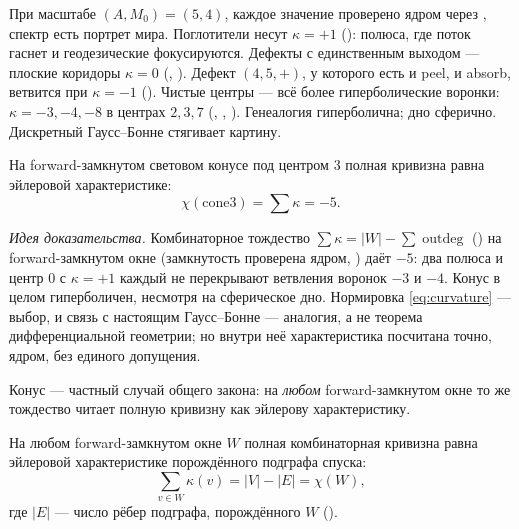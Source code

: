 При масштабе $(A, M_0) = (5, 4)$, каждое значение проверено ядром через , спектр есть
портрет мира. Поглотители несут $\kappa = +1$ (): полюса, где поток гаснет и
геодезические фокусируются. Дефекты с единственным выходом --- плоские коридоры $\kappa = 0$
(, ). Дефект $(4,5,+)$, у которого есть и
peel, и absorb, ветвится при $\kappa = -1$ (). Чистые центры --- всё
более гиперболические воронки: $\kappa = -3, -4, -8$ в центрах $2, 3, 7$ (,
, ). Генеалогия гиперболична; дно сферично.
Дискретный Гаусс--Бонне стягивает картину.

\begin{theorem}\label{thm:gaussBonnet_cone3}
\green{} На forward-замкнутом световом конусе под центром $3$ полная кривизна равна эйлеровой
характеристике:
\begin{equation}\label{eq:gaussBonnet}
\chi(\mathrm{cone3}) = \textstyle\sum \kappa = -5.
\end{equation}
\end{theorem}

\emph{Идея доказательства.} Комбинаторное тождество $\sum\kappa = |W| - \sum\operatorname{outdeg}$
() на forward-замкнутом окне  (замкнутость проверена ядром,
) даёт $-5$: два полюса и центр $0$ с $\kappa = +1$ каждый не перекрывают
ветвления воронок $-3$ и $-4$. Конус в целом гиперболичен, несмотря на сферическое дно. Нормировка
\cref{eq:curvature} --- выбор, и связь с настоящим Гаусс--Бонне --- аналогия, а не теорема
дифференциальной геометрии; но внутри неё характеристика посчитана точно, ядром, без единого допущения.

Конус --- частный случай общего закона: на \emph{любом} forward-замкнутом окне то же тождество читает
полную кривизну как эйлерову характеристику.

\begin{theorem}\label{thm:gaussBonnet_eq_euler}
\green{} На любом forward-замкнутом окне $W$ полная комбинаторная кривизна равна эйлеровой
характеристике порождённого подграфа спуска:
\begin{equation}\label{eq:gaussBonnetEuler}
\textstyle\sum_{v\in W} \kappa(v) = |V| - |E| = \chi(W),
\end{equation}
где $|E|$ --- число рёбер подграфа, порождённого $W$ ().
\end{theorem}

